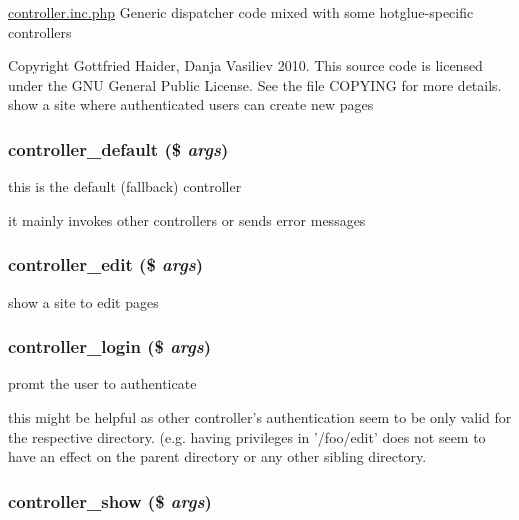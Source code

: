 \hyperlink{controller_8inc_8php}{controller.inc.php} Generic dispatcher code mixed with some hotglue-specific controllers

Copyright Gottfried Haider, Danja Vasiliev 2010. This source code is licensed under the GNU General Public License. See the file COPYING for more details. show a site where authenticated users can create new pages \hypertarget{controller_8inc_8php_e9c67435a37f4b70d0769079c9dbf379}{
\subsubsection[{controller\_\-default}]{\setlength{\rightskip}{0pt plus 5cm}controller\_\-default (\$ {\em args})}}
\label{controller_8inc_8php_e9c67435a37f4b70d0769079c9dbf379}


this is the default (fallback) controller

it mainly invokes other controllers or sends error messages \hypertarget{controller_8inc_8php_406fb5b2a2a93bef89e4ba46f8829d2f}{
\subsubsection[{controller\_\-edit}]{\setlength{\rightskip}{0pt plus 5cm}controller\_\-edit (\$ {\em args})}}
\label{controller_8inc_8php_406fb5b2a2a93bef89e4ba46f8829d2f}


show a site to edit pages \hypertarget{controller_8inc_8php_c3e283e26869e2ffd938bdf9775c3e81}{
\subsubsection[{controller\_\-login}]{\setlength{\rightskip}{0pt plus 5cm}controller\_\-login (\$ {\em args})}}
\label{controller_8inc_8php_c3e283e26869e2ffd938bdf9775c3e81}


promt the user to authenticate

this might be helpful as other controller's authentication seem to be only valid for the respective directory. (e.g. having privileges in '/foo/edit' does not seem to have an effect on the parent directory or any other sibling directory. \hypertarget{controller_8inc_8php_d135971740244b9e81718d4cd0407b11}{
\subsubsection[{controller\_\-show}]{\setlength{\rightskip}{0pt plus 5cm}controller\_\-show (\$ {\em args})}}
\label{controller_8inc_8php_d135971740244b9e81718d4cd0407b11}


